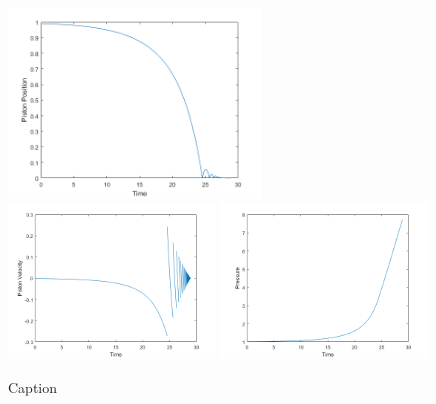 \begin{figure}[!ht]
    \centering
    \includegraphics[width=0.6\textwidth]{Figures/Example/PositionTimeTrajectory.png}
    \includegraphics[width=0.49\textwidth]{Figures/Example/VelocityTimeTrajectory.png}
    \includegraphics[width=0.49\textwidth]{Figures/Example/PressureTimeTrajectory.png}
    \caption{Caption}
    \label{fig:TimeTrajec}
\end{figure}

